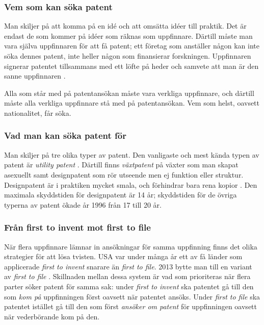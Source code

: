 \subsubsection{Vem som kan söka patent}

Man skiljer på att komma på en idé och att omsätta idéer till praktik. Det är endast de som kommer på idéer som räknas som uppfinnare. Därtill måste man vara själva uppfinnaren för att få patent; ett företag som anställer någon kan inte söka dennes patent, inte heller någon som finansierar forskningen. Uppfinnaren signerar patentet tillsammans med ett löfte på heder och samvete att man är den sanne uppfinnaren \cite{cmu-overview}.

Alla som står med på patentansökan måste vara verkliga uppfinnare, och därtill måste alla verkliga uppfinnare stå med på patentansökan. Vem som helst, oavsett nationalitet, får söka.



\subsubsection{Vad man kan söka patent för}

Man skiljer på tre olika typer av patent. Den vanligaste och mest kända typen av patent är \emph{utility patent} \cite{cmu-overview}.
Därtill finns \emph{växtpatent} på växter som man skapat asexuellt samt designpatent som rör utseende men ej funktion eller struktur. Designpatent är i praktiken mycket smala, och förhindrar bara rena kopior . Den maximala skyddstiden för designpatent är 14 år; skyddstiden för de övriga typerna av patent ökade år 1996 från 17 till 20 år.


\subsubsection{Från first to invent mot first to file} 

När flera uppfinnare lämnar in ansökningar för samma uppfinning finns det olika strategier för att lösa tvisten. USA var under många år ett av få länder som applicerade \emph{first to invent} snarare än \emph{first to file}. 2013 bytte man till en variant av \emph{first to file} \cite{leahy}.%
Skillnaden mellan dessa system är vad som prioriteras när flera parter söker patent för samma sak: under \emph{first to invent} ska patentet gå till den som \emph{kom på} uppfinningen först oavsett när patentet ansöks. Under \emph{first to file} ska patentet istället gå till den som först \emph{ansöker om patent} för uppfinningen oavsett när vederbörande kom på den. 

